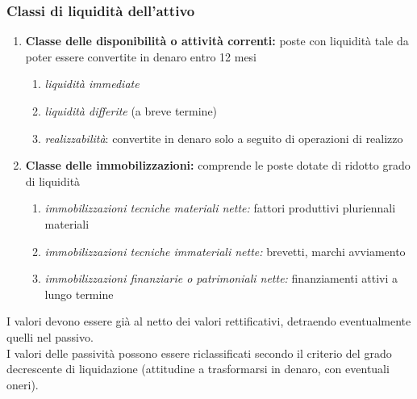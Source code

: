\documentclass{report}
\begin{document}
	\subsubsection{Classi di liquidità dell'attivo}
	\begin{enumerate}
		\item \textbf{Classe delle disponibilità o attività correnti:} poste con liquidità tale da poter essere convertite in denaro entro 12 mesi
		\begin{enumerate}[label=\alph*)]
			\item \textit{liquidità immediate}
			\item \textit{liquidità differite} (a breve termine)
			\item \textit{realizzabilità}: convertite in denaro solo a seguito di operazioni di realizzo
		\end{enumerate}
		\item \textbf{Classe delle immobilizzazioni:} comprende le poste dotate di ridotto grado di liquidità
		\begin{enumerate}[label=\alph*)]
			\item \textit{immobilizzazioni tecniche materiali nette:} fattori produttivi pluriennali materiali
			\item \textit{immobilizzazioni tecniche immateriali nette:} brevetti, marchi avviamento
			\item \textit{immobilizzazioni finanziarie o patrimoniali nette:} finanziamenti attivi a lungo termine
		\end{enumerate}
	\end{enumerate}
	I valori devono essere già al netto dei valori rettificativi, detraendo eventualmente quelli nel passivo.
	\medskip \\I valori delle passività possono essere riclassificati secondo il criterio del grado decrescente di liquidazione (attitudine  a trasformarsi in denaro, con eventuali oneri).
\end{document}
